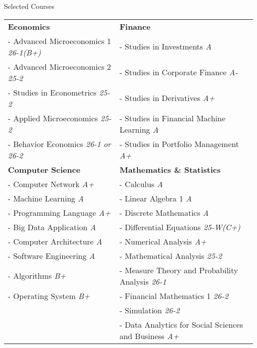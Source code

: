 \documentclass{resume} %
\begin{document}
\begin{rSection}{Selected Courses}
\begin{tabular}{p{} p{}}

\textbf{Economics} & \textbf{Finance} \\
- Advanced Microeconomics 1 \hfill {\em 26-1(B+)} & - Studies in Investments \hfill {\em A} \\
- Advanced Microeconomics 2 \hfill {\em 25-2} & - Studies in Corporate Finance \hfill {\em A-} \\
- Studies in Econometrics \hfill {\em 25-2} & - Studies in Derivatives \hfill {\em A+} \\
- Applied Microeconomics \hfill {\em 25-2} & - Studies in Financial Machine Learning \hfill {\em A} \\
- Behavior Economics \hfill {\em 26-1 or 26-2} & - Studies in Portfolio Management \hfill {\em A+} \\
[10pt]

\textbf{Computer Science} & \textbf{Mathematics \& Statistics}  \\
- Computer Network \hfill {\em A+} & - Calculus \hfill {\em A} \\
- Machine Learning \hfill {\em A} & - Linear Algebra 1 \hfill {\em A} \\
- Programming Language \hfill {\em A+} & - Discrete Mathematics \hfill {\em A} \\
- Big Data Application \hfill {\em A} & - Differential Equations \hfill {\em 25-W(C+)} \\
- Computer Architecture	 \hfill {\em A} & - Numerical Analysis \hfill {\em A+} \\
- Software Engineering \hfill {\em A} & - Mathematical Analysis \hfill {\em 25-2} \\
- Algorithms	 \hfill {\em B+} & - Measure Theory and Probability Analysis \hfill {\em 26-1} \\
- Operating System \hfill {\em B+} & - Financial Mathematics 1 \hfill {\em 26-2} \\
& - Simulation \hfill {\em 26-2} \\ 
& - Data Analytics for Social Sciences and Business \hfill {\em A+} \\
 


\end{tabular}
\end{rSection}
\end{document}
